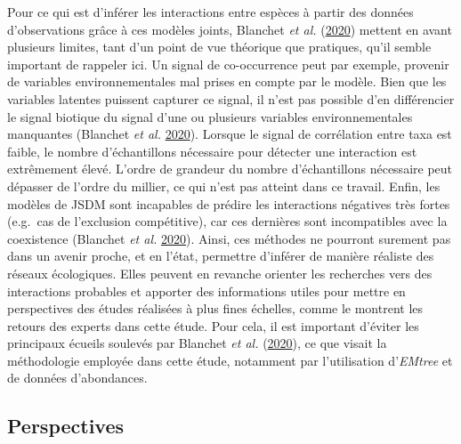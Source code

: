 \documentclass[12pt,]{article}
\begin{document}
Pour ce qui est d'inférer les interactions entre espèces à partir des
données d'observations grâce à ces modèles joints, Blanchet \emph{et
al.} (\protect\hyperlink{ref-Blanchet_2020}{2020}) mettent en avant
plusieurs limites, tant d'un point de vue théorique que pratiques, qu'il
semble important de rappeler ici. Un signal de co-occurrence peut par
exemple, provenir de variables environnementales mal prises en compte
par le modèle. Bien que les variables latentes puissent capturer ce
signal, il n'est pas possible d'en différencier le signal biotique du
signal d'une ou plusieurs variables environnementales manquantes
(Blanchet \emph{et al.} \protect\hyperlink{ref-Blanchet_2020}{2020}).
Lorsque le signal de corrélation entre taxa est faible, le nombre
d'échantillons nécessaire pour détecter une interaction est extrêmement
élevé. L'ordre de grandeur du nombre d'échantillons nécessaire peut
dépasser de l'ordre du millier, ce qui n'est pas atteint dans ce
travail. Enfin, les modèles de JSDM sont incapables de prédire les
interactions négatives très fortes (e.g.~cas de l'exclusion
compétitive), car ces dernières sont incompatibles avec la coexistence
(Blanchet \emph{et al.} \protect\hyperlink{ref-Blanchet_2020}{2020}).
Ainsi, ces méthodes ne pourront surement pas dans un avenir proche, et
en l'état, permettre d'inférer de manière réaliste des réseaux
écologiques. Elles peuvent en revanche orienter les recherches vers des
interactions probables et apporter des informations utiles pour mettre
en perspectives des études réalisées à plus fines échelles, comme le
montrent les retours des experts dans cette étude. Pour cela, il est
important d'éviter les principaux écueils soulevés par Blanchet \emph{et
al.} (\protect\hyperlink{ref-Blanchet_2020}{2020}), ce que visait la
méthodologie employée dans cette étude, notamment par l'utilisation
d'\emph{EMtree} et de données d'abondances.

\hypertarget{perspectives}{%
\subsection{Perspectives}\label{perspectives}}
\end{document}
